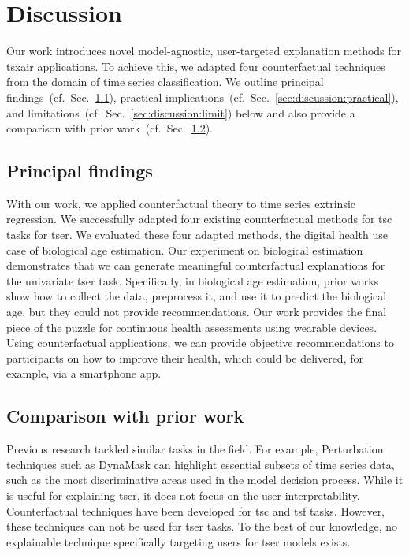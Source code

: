 \section{Discussion}
\label{sec:discussion}


Our work introduces novel model-agnostic, user-targeted explanation methods for \gls{tsxair} applications.
To achieve this, we adapted four counterfactual techniques from the domain of time series classification.
We outline principal findings~(cf.~Sec.~\ref{sec:discussion:principal}), practical implications~(cf.~Sec.~\ref{sec:discussion:practical}), and limitations~(cf.~Sec.~\ref{sec:discussion:limit}) below and also provide a comparison with prior work~(cf.~Sec.~\ref{sec:discussion:comparison}).

\subsection{Principal findings}
\label{sec:discussion:principal}
With our work, we applied counterfactual theory to time series extrinsic regression. We successfully adapted four existing counterfactual methods for \gls{tsc} tasks for \gls{tser}. We evaluated these four adapted methods, the digital health use case of biological age estimation. Our experiment on biological estimation demonstrates that we can generate meaningful counterfactual explanations for the univariate \gls{tser} task. Specifically, in biological age estimation, prior works show how to collect the data, preprocess it, and use it to predict the biological age, but they could not provide recommendations. Our work provides the final piece of the puzzle for continuous health assessments using wearable devices. Using counterfactual applications, we can provide objective recommendations to participants on how to improve their health, which could be delivered, for example, via a smartphone app.

\subsection{Comparison with prior work} 
\label{sec:discussion:comparison}
 Previous research tackled similar tasks in the field. For example,  Perturbation techniques such as DynaMask \cite{crabbe_explaining_2021} can highlight essential subsets of time series data, such as the most discriminative areas used in the model decision process. While it is useful for explaining \gls{tser}, it does not focus on the user-interpretability. Counterfactual techniques have been developed for \gls{tsc} \cite{hollig_tsevo_2022, delaney_instance-based_2021} and \gls{tsf} \cite{wang_counterfactual_2023} tasks. However, these techniques can not be used for \gls{tser} tasks. To the best of our knowledge, no explainable technique specifically targeting users for \gls{tser} models exists.

